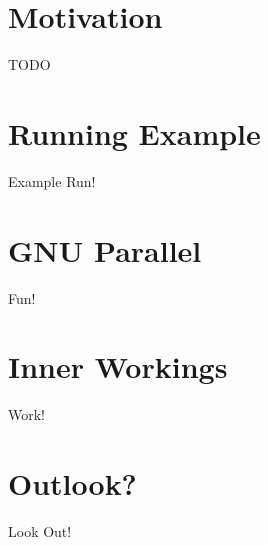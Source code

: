 


\section{Motivation}
\begin{frame}{TODO}
\end{frame}
\section{Running Example}
\begin{frame}{Example Run!}
\end{frame}
\section{\texorpdfstring{GNU}{\textsc{gnu}} Parallel}
\begin{frame}{Fun!}

\end{frame}

\section{Inner Workings}
\begin{frame}{Work!}
\end{frame}

\section{Outlook?}
\begin{frame}{Look Out!}
\end{frame}

